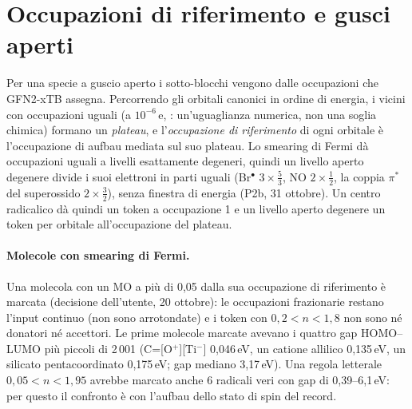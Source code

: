 \documentclass[11pt,a4paper]{report}
\newcommand{\code}[1]{\texttt{\detokenize{#1}}}
\begin{document}
\section{Occupazioni di riferimento e gusci aperti}
Per una specie a guscio aperto i sotto-blocchi vengono dalle occupazioni che GFN2-xTB assegna.
Percorrendo gli orbitali canonici in ordine di energia, i vicini con occupazioni uguali (a
$10^{-6}$\,e, \code{PLATEAU_TOL}: un'uguaglianza numerica, non una soglia chimica) formano un
\emph{plateau}, e l'\emph{occupazione di riferimento} di ogni orbitale è l'occupazione di aufbau
mediata sul suo plateau. Lo smearing di Fermi dà occupazioni uguali a livelli esattamente degeneri,
quindi un livello aperto degenere divide i suoi elettroni in parti uguali (Br$^\bullet$
$3\times\tfrac53$, NO $2\times\tfrac12$, la coppia $\pi^*$ del superossido $2\times\tfrac32$), senza
finestra di energia (P2b, 31 ottobre). Un centro radicalico dà quindi un token a occupazione 1 e un
livello aperto degenere un token per orbitale all'occupazione del plateau.

\paragraph{Molecole con smearing di Fermi.} Una molecola con un MO a più di 0{,}05 dalla sua
occupazione di riferimento è marcata \code{fermi_smeared} (decisione dell'utente, 20 ottobre): le
occupazioni frazionarie restano l'input continuo (non sono arrotondate) e i token con
$0{,}2<n<1{,}8$ non sono né donatori né accettori. Le prime molecole marcate avevano i quattro gap
HOMO--LUMO più piccoli di 2\,001 (C=[O$^+$][Ti$^-$] 0{,}046\,eV, un catione allilico 0{,}135\,eV, un
silicato pentacoordinato 0{,}175\,eV; gap mediano 3{,}17\,eV). Una regola letterale $0{,}05<n<1{,}95$
avrebbe marcato anche 6 radicali veri con gap di 0{,}39--6{,}1\,eV: per questo il confronto è con
l'aufbau dello stato di spin del record.
\end{document}
